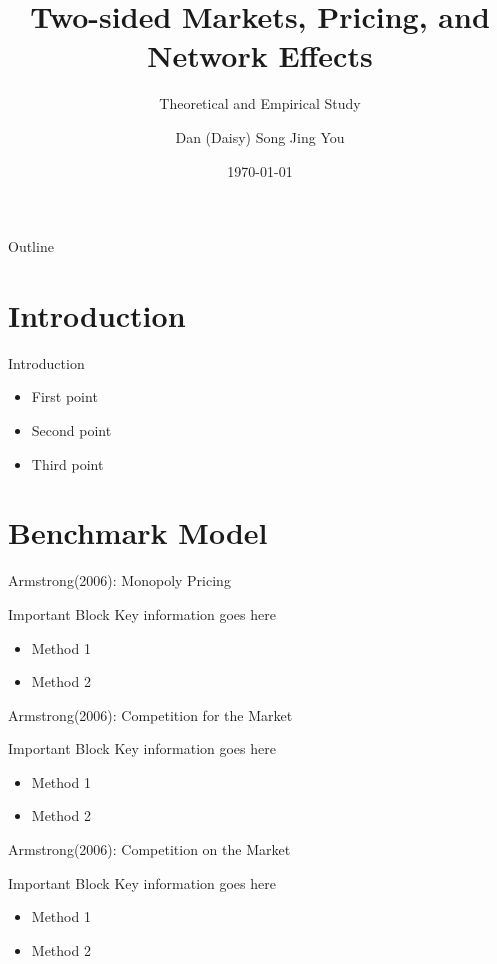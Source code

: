 \documentclass[aspectratio=169]{beamer}  %
\title{Two-sided Markets, Pricing, and Network Effects}
\subtitle{Theoretical and Empirical Study}
\author{Dan (Daisy) Song \quad Jing You}
\institute{Hong Kong University of Science and Technology}
\date{\today}
\begin{document}
\begin{frame}
    \titlepage
\end{frame}

\begin{frame}{Outline}
    \tableofcontents
\end{frame}

\section{Introduction}
\begin{frame}{Introduction}
    \begin{itemize}
        \item First point
        \item Second point
        \item Third point
    \end{itemize}
\end{frame}

\section{Benchmark Model}
\begin{frame}{Armstrong(2006): Monopoly Pricing}
    \begin{block}{Important Block}
        Key information goes here
    \end{block}
    
    \begin{itemize}
        \item Method 1
        \item Method 2
    \end{itemize}
\end{frame}

\begin{frame}{Armstrong(2006): Competition for the Market}
    \begin{block}{Important Block}
        Key information goes here
    \end{block}
    
    \begin{itemize}
        \item Method 1
        \item Method 2
    \end{itemize}
\end{frame}

\begin{frame}{Armstrong(2006): Competition on the Market}
    \begin{block}{Important Block}
        Key information goes here
    \end{block}
    
    \begin{itemize}
        \item Method 1
        \item Method 2
    \end{itemize}
\end{frame}
\end{document}
